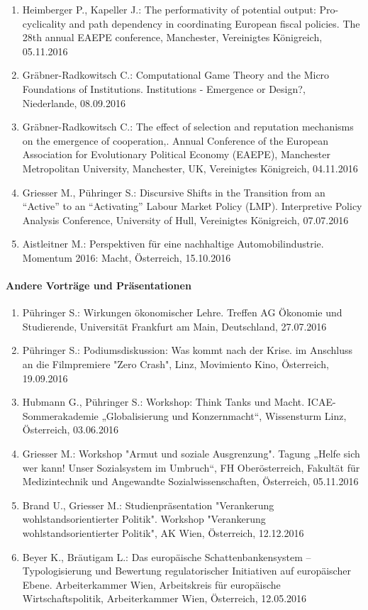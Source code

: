\begin{enumerate}
	\item Heimberger P., Kapeller J.: The performativity of potential output: Pro-cyclicality and path dependency in coordinating European fiscal policies. The 28th annual EAEPE conference, Manchester, Vereinigtes Königreich, 05.11.2016
	\item Gräbner-Radkowitsch C.: Computational Game Theory and the Micro Foundations of Institutions. Institutions - Emergence or Design?, Niederlande, 08.09.2016
	\item Gräbner-Radkowitsch C.: The effect of selection and reputation mechanisms on the emergence of cooperation,. Annual Conference of the European Association for Evolutionary Political Economy (EAEPE), Manchester Metropolitan University, Manchester, UK, Vereinigtes Königreich, 04.11.2016
	\item Griesser M., Pühringer S.: Discursive Shifts in the Transition from an “Active” to an “Activating” Labour Market Policy (LMP). Interpretive Policy Analysis Conference, University of Hull, Vereinigtes Königreich, 07.07.2016
	\item Aistleitner M.: Perspektiven für eine nachhaltige Automobilindustrie. Momentum 2016: Macht, Österreich, 15.10.2016
\end{enumerate}
\paragraph{Andere Vorträge und Präsentationen}
\begin{enumerate}
	\item Pühringer S.: Wirkungen ökonomischer Lehre. Treffen AG Ökonomie und Studierende, Universität Frankfurt am Main, Deutschland, 27.07.2016
	\item Pühringer S.: Podiumsdiskussion: Was kommt nach der Krise. im Anschluss an die Filmpremiere "Zero Crash", Linz, Movimiento Kino, Österreich, 19.09.2016
	\item Hubmann G., Pühringer S.: Workshop: Think Tanks und Macht. ICAE-Sommerakademie „Globalisierung und Konzernmacht“, Wissensturm Linz, Österreich, 03.06.2016
	\item Griesser M.: Workshop "Armut und soziale Ausgrenzung". Tagung „Helfe sich wer kann! Unser Sozialsystem im Umbruch“, FH Oberösterreich, Fakultät für Medizintechnik und Angewandte Sozialwissenschaften, Österreich, 05.11.2016
	\item Brand U., Griesser M.: Studienpräsentation "Verankerung wohlstandsorientierter Politik". Workshop "Verankerung wohlstandsorientierter Politik", AK Wien, Österreich, 12.12.2016
	\item Beyer K., Bräutigam L.: Das europäische Schattenbankensystem – Typologisierung und Bewertung regulatorischer Initiativen auf europäischer Ebene. Arbeiterkammer Wien, Arbeitskreis für europäische Wirtschaftspolitik, Arbeiterkammer Wien, Österreich, 12.05.2016
\end{enumerate}
